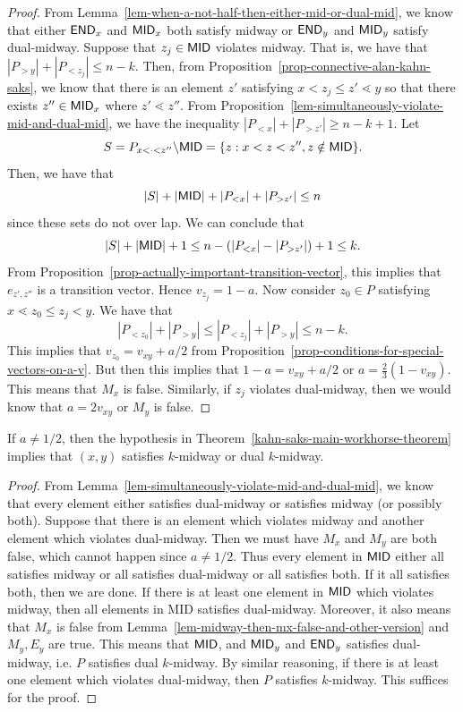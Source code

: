 \documentclass{puthesis-UG}
\begin{document}
\begin{proof}
	From Lemma~\ref{lem-when-a-not-half-then-either-mid-or-dual-mid}, we know that either $\mathsf{END}_x$ and $\mathsf{MID}_x$ both satisfy midway or $\mathsf{END}_y$ and $\mathsf{MID}_y$ satisfy dual-midway. Suppose that $z_j \in \mathsf{MID}$ violates midway. That is, we have that $|P_{> y}| + |P_{<z_j}| \leq n-k$. Then, from Proposition~\ref{prop-connective-alan-kahn-saks}, we know that there is an element $z'$ satisfying $x < z_j \leq z' \lessdot y$ so that there exists $z'' \in \mathsf{MID}_x$ where $z' \lessdot z''$. From Proposition~\ref{lem-simultaneously-violate-mid-and-dual-mid}, we have the inequality $|P_{< x}| + |P_{>z'}| \geq n-k+1$. Let 
	\[
		S = P_{x < \cdot < z''} \backslash \mathsf{MID} = \{z : x < z < z'', z \notin \mathsf{MID}\}.
	\]
	Then, we have that 
	\[
		|S| + |\mathsf{MID}| + |P_{< x}| + |P_{>z'}| \leq n
	\]
	since these sets do not over lap. We can conclude that 
	\[
		|S| + |\mathsf{MID}| + 1 \leq n - (|P_{< x}| - |P_{> z'}|) + 1 \leq k.
	\]
	From Proposition~\ref{prop-actually-important-transition-vector}, this implies that $e_{z', z''}$ is a transition vector. Hence $v_{z_j} = 1-a$. Now consider $z_0 \in P$ satisfying $x \lessdot z_0 \leq z_j < y$. We have that 
	\[
		|P_{< z_0}| + |P_{> y}| \leq |P_{< z_j}| + |P_{> y}| \leq n-k.
	\]
	This implies that $v_{z_0} = v_{xy} + a/2$ from Proposition~\ref{prop-conditions-for-special-vectors-on-a-v}. But then this implies that $1 - a = v_{xy} + a/2$ or $a = \frac{2}{3} (1 - v_{xy})$. This means that $M_x$ is false. Similarly, if $z_j$ violates dual-midway, then we would know that $a = 2v_{xy}$ or $M_y$ is false.
\end{proof}

\begin{lem}
	If $a \neq 1/2$, then the hypothesis in Theorem~\ref{kahn-saks-main-workhorse-theorem} implies that $(x, y)$ satisfies $k$-midway or dual $k$-midway. 
\end{lem}

\begin{proof}
	From Lemma~\ref{lem-simultaneously-violate-mid-and-dual-mid}, we know that every element either satisfies dual-midway or satisfies midway (or possibly both). Suppose that there is an element which violates midway and another element which violates dual-midway. Then we must have $M_x$ and $M_y$ are both false, which cannot happen since $a \neq 1/2$. Thus every element in $\mathsf{MID}$ either all satisfies midway or all satisfies dual-midway or all satisfies both. If it all satisfies both, then we are done. If there is at least one element in $\mathsf{MID}$ which violates midway, then all elements in MID satisfies dual-midway. Moreover, it also means that $M_x$ is false from Lemma~\ref{lem-midway-then-mx-false-and-other-version} and $M_y, E_y$ are true. This means that $\mathsf{MID}$, and $\mathsf{MID}_y$ and $\mathsf{END}_y$ satisfies dual-midway, i.e. $P$ satisfies dual $k$-midway. By similar reasoning, if there is at least one element which violates dual-midway, then $P$ satisfies $k$-midway. This suffices for the proof. 
\end{proof}
\end{document}
